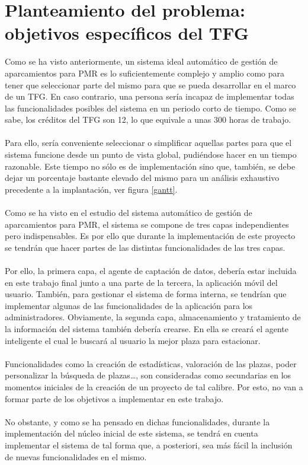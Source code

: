 \chapter{Planteamiento del problema: objetivos específicos del TFG}
Como se ha visto anteriormente, un sistema ideal automático de gestión de aparcamientos para PMR es lo suficientemente complejo y amplio como para tener que seleccionar parte del mismo para que se pueda desarrollar en el marco de un TFG. En caso contrario, una persona sería incapaz de implementar todas las funcionalidades posibles del sistema en un periodo corto de tiempo. Como se sabe, los créditos del TFG son 12, lo que equivale a unas 300 horas de trabajo.
\\\\
Para ello, sería conveniente seleccionar o simplificar aquellas partes para que el sistema funcione desde un punto de vista global, pudiéndose hacer en un tiempo razonable. Este tiempo no sólo es de implementación sino que, también, se debe dejar un porcentaje bastante elevado del mismo para un análisis exhaustivo precedente a la implantación, ver figura \ref{gantt}.
\\\\
Como se ha visto en el estudio del sistema automático de gestión de aparcamientos para PMR, el sistema se compone de tres capas independientes pero indispensables. Es por ello que durante la implementación de este proyecto se tendrán que hacer partes de las distintas funcionalidades de las tres capas.
\\\\
Por ello, la primera capa, el agente de captación de datos, debería estar incluida en este trabajo final junto a una parte de la tercera, la aplicación móvil del usuario. También, para gestionar el sistema de forma interna, se tendrían que implementar algunas de las funcionalidades de la aplicación para los administradores. Obviamente, la segunda capa, almacenamiento y tratamiento de la información del sistema también debería  crearse. En ella se creará el agente inteligente el cual le buscará al usuario la mejor plaza para estacionar.
\\\\
Funcionalidades como la creación de estadísticas, valoración de las plazas, poder personalizar la búsqueda de plazas…, son consideradas como secundarias en los momentos iniciales de la creación de un proyecto de tal calibre. Por esto, no van a formar parte de los objetivos a implementar en este trabajo.
\\\\
No obstante, y como se ha pensado en dichas funcionalidades, durante la implementación del núcleo inicial de este sistema, se tendrá en cuenta implementar el sistema de tal forma que, a posteriori, sea más fácil la inclusión de nuevas funcionalidades en el mismo.
\\\\
